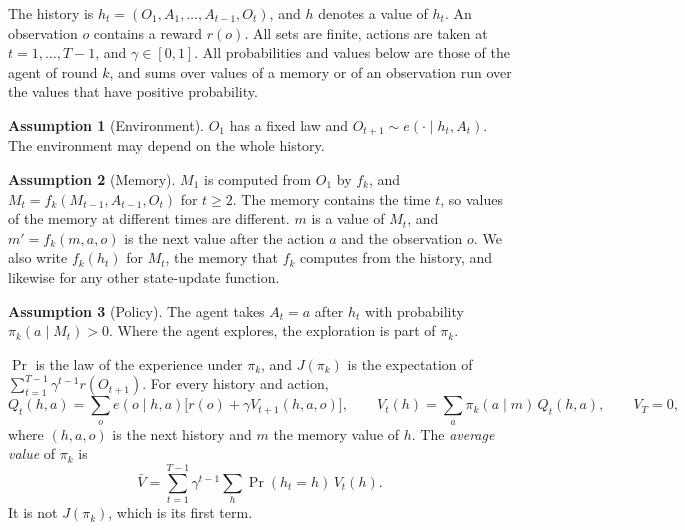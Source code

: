 \documentclass[11pt]{article}
\theoremstyle{definition}
\newtheorem{assumption}{Assumption}
\begin{document}
The history is $h_t=(O_1,A_1,\dots,A_{t-1},O_t)$, and $h$ denotes a value of $h_t$. An observation $o$ contains a reward $r(o)$. All sets are finite, actions are taken at $t=1,\dots,T-1$, and $\gamma\in[0,1]$. All probabilities and values below are those of the agent of round $k$, and sums over values of a memory or of an observation run over the values that have positive probability.

\begin{assumption}[Environment]\label{as:env}
$O_1$ has a fixed law and $O_{t+1}\sim e(\cdot\mid h_t,A_t)$. The environment may depend on the whole history.
\end{assumption}
\begin{assumption}[Memory]\label{as:mem}
$M_1$ is computed from $O_1$ by $f_k$, and $M_t=f_k(M_{t-1},A_{t-1},O_t)$ for $t\ge2$. The memory contains the time $t$, so values of the memory at different times are different. $m$ is a value of $M_t$, and $m'=f_k(m,a,o)$ is the next value after the action $a$ and the observation $o$. We also write $f_k(h_t)$ for $M_t$, the memory that $f_k$ computes from the history, and likewise for any other state-update function.
\end{assumption}
\begin{assumption}[Policy]\label{as:pol}
The agent takes $A_t=a$ after $h_t$ with probability $\pi_k(a\mid M_t)>0$. Where the agent explores, the exploration is part of $\pi_k$.
\end{assumption}

$\Pr$ is the law of the experience under $\pi_k$, and $J(\pi_k)$ is the expectation of $\sum_{t=1}^{T-1}\gamma^{t-1}r(O_{t+1})$. For every history and action,
\begin{equation}\label{eq:bellman}
Q_t(h,a)=\sum_oe(o\mid h,a)\big[r(o)+\gamma V_{t+1}(h,a,o)\big],\qquad V_t(h)=\sum_a\pi_k(a\mid m)\,Q_t(h,a),\qquad V_T=0,
\end{equation}
where $(h,a,o)$ is the next history and $m$ the memory value of $h$. The \emph{average value} of $\pi_k$ is
\begin{equation}\label{eq:Vbar}
\bar V=\sum_{t=1}^{T-1}\gamma^{t-1}\sum_h\Pr(h_t=h)\,V_t(h).
\end{equation}
It is not $J(\pi_k)$, which is its first term.
\end{document}
